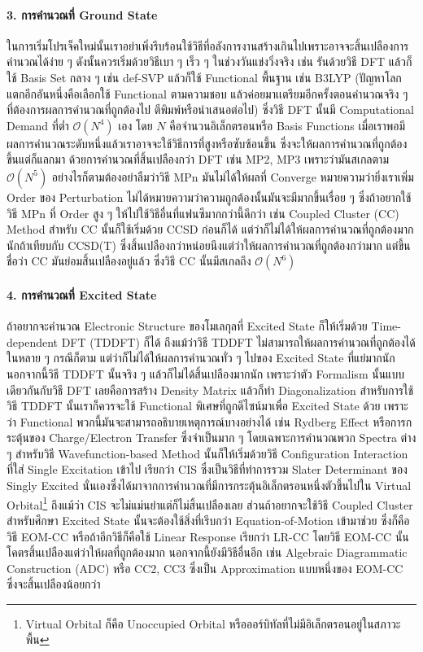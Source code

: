 \paragraph{3. การคำนวณที่ Ground State}
ในการเริ่มโปรเจ็คใหม่นั้นเราอย่าเพิ่งรีบร้อนใช้วิธีที่อลังการงานสร้างเกินไปเพราะอาจจะสิ้นเปลืองการคำนวณได้ง่าย ๆ ดังนั้นควรเริ่มด้วยวิธีเบา ๆ เร็ว ๆ
ในช่วงวันแข่งวิ่งจริง เช่น รันด้วยวิธี DFT แล้วก็ใช้ Basis Set กลาง ๆ เช่น def-SVP แล้วก็ใช้ Functional พื้นฐาน เช่น B3LYP
(ปัญหาโลกแตกอีกอันหนึ่งคือเลือกใช้ Functional ตามความชอบ แล้วค่อยมาเเตรียมอีกครั้งตอนคำนวณจริง ๆ ที่ต้องการผลการคำนวณที่ถูกต้องไป%
ตีพิมพ์หรือนำเสนอต่อไป) ซึ่งวิธี DFT นั้นมี Computational Demand ที่ต่ำ $\mathcal{O}(N^{4})$ เอง โดย $N$ คือจำนวนอิเล็กตรอนหรือ
Basis Functions เมื่อเราพอมีผลการคำนวณระดับหนึ่งแล้วเราอาจจะใช้วิธีการที่สูงหรือซับซ้อนขึ้น ซึ่งจะให้ผลการคำนวณที่ถูกต้องขึ้นแต่ก็แลกมา%
ด้วยการคำนวณที่สิ้นเปลืองกว่า DFT เช่น MP2, MP3 เพราะว่ามันสเกลตาม $\mathcal{O}(N^{5})$ อย่างไรก็ตามต้องอย่าลืมว่าวิธี MPn
มันไม่ได้ให้ผลที่ Converge หมายความว่ายิ่งเราเพิ่ม Order ของ Perturbation ไม่ได้หมายความว่าความถูกต้องนั้นมันจะมีมากขึ้นเรื่อย ๆ
ซึ่งถ้าอยากใช้วิธี MPn ที่ Order สูง ๆ ให้ไปใช้วิธีอื่นที่แฟนซีมากกว่านี้ดีกว่า เช่น Coupled Cluster (CC) Method สำหรับ CC นั้นก็ใช้เริ่มด้วย
CCSD ก่อนก็ได้ แต่ว่าก็ไม่ได้ให้ผลการคำนวณที่ถูกต้องมากนักถ้าเทียบกับ CCSD(T) ซึ่งสิ้นเปลืองกว่าหน่อยนึงแต่ว่าให้ผลการคำนวณที่ถูกต้องกว่ามาก
แต่ขึ้นชื่อว่า CC มันย่อมสิ้นเปลืองอยู่แล้ว ซึ่งวิธี CC นั้นมีสเกลถึง $\mathcal{O}(N^{6})$

\paragraph{4. การคำนวณที่ Excited State}
ถ้าอยากจะคำนวณ Electronic Structure ของโมเลกุลที่ Excited State ก็ให้เริ่มด้วย Time-dependent DFT (TDDFT) ก็ได้ ถึงแม้ว่าวิธี
TDDFT ไม่สามารถให้ผลการคำนวณที่ถูกต้องได้ในหลาย ๆ กรณีก็ตาม แต่ว่าก็ไม่ได้ให้ผลการคำนวณทั่ว ๆ ไปของ Excited State ที่แย่มากนัก
นอกจากนี้วิธี TDDFT นั้นจริง ๆ แล้วก็ไม่ได้สิ้นเปลืองมากนัก เพราะว่าตัว Formalism นั้นแบบเดียวกันกับวิธี DFT เลยคือการสร้าง Density Matrix
แล้วก็ทำ Diagonalization สำหรับการใช้วิธี TDDFT นั้นเราก็ควรจะใช้ Functional พิเศษที่ถูกดีไซน์มาเพื่อ Excited State ด้วย เพราะว่า
Functional พวกนี้มันจะสามารถอธิบายเหตุการณ์บางอย่างได้ เช่น Rydberg Effect หรือการกระตุ้นของ Charge/Electron Transfer
ซึ่งจำเป็นมาก ๆ โดยเฉพาะการคำนวณพวก Spectra ต่าง ๆ สำหรับวิธี Wavefunction-based Method นั้นก็ให้เริ่มด้วยวิธี Configuration
Interaction ที่ใส่ Single Excitation เข้าไป เรียกว่า CIS ซึ่งเป็นวิธีที่ทำการรวม Slater Determinant ของ Singly Excited
นั่นเองซึ่งได้มาจากการคำนวณที่มีการกระตุ้นอิเล็กตรอนหนึ่งตัวขึ้นไปใน Virtual Orbital\footnote{Virtual Orbital ก็คือ Unoccupied
Orbital หรือออร์บิทัลที่ไม่มีอิเล็กตรอนอยู่ในสภาวะพื้น} ถึงแม้ว่า CIS จะไม่แม่นยำแต่ก็ไม่สิ้นเปลืองเลย ส่วนถ้าอยากจะใช้วิธี Coupled Cluster
สำหรับศึกษา Excited State นั้นจะต้องใช้สิ่งที่เรีบกว่า Equation-of-Motion เข้ามาช่วย ซึ่งก็คือวิธี EOM-CC หรือถ้าอีกวิธีก็คือใช้ Linear
Response เรียกว่า LR-CC โดยวิธี EOM-CC นั้นโคตรสิ้นเปลืองแต่ว่าให้ผลที่ถูกต้องมาก นอกจากนี้ยังมีวิธีอื่นอีก เช่น Algebraic Diagrammatic
Construction (ADC) หรือ CC2, CC3 ซึ่งเป็น Approximation แบบหนึ่งของ EOM-CC ซึ่งจะสิ้นเปลืองน้อยกว่า

